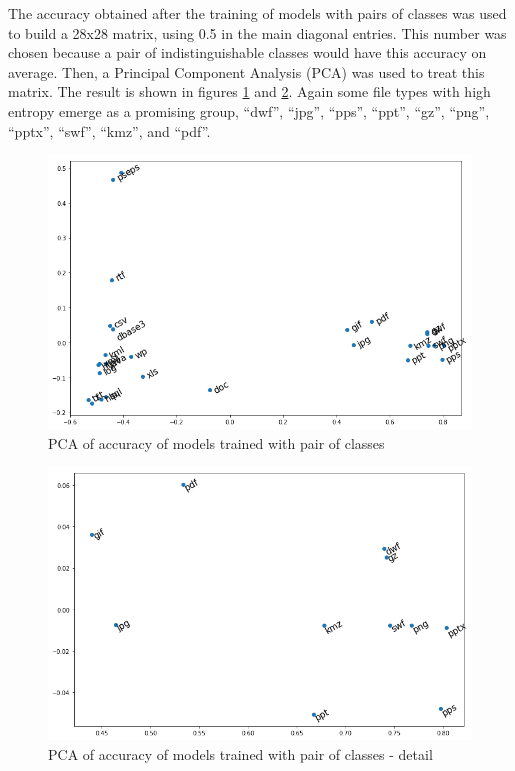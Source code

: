 The accuracy obtained after the training of models with pairs of classes was used to build a 28x28 matrix, using 0.5 in the main diagonal entries. This number was chosen because a pair of indistinguishable classes would have this accuracy on average. Then, a Principal Component Analysis (PCA) \cite{amirani_new_2008} was used to treat this matrix. The result is shown in figures \ref{fig:pca} and \ref{fig:pca2}. Again some file types with high entropy emerge as a promising group,  ``dwf'',
``jpg'',
``pps'',
``ppt'',
``gz'',
``png'',
``pptx'',
``swf'',
``kmz'',
and ``pdf''.

\noindent
\begin{figure}[htb!]
\centering\includegraphics[width=1.0\textwidth]{content/pca.png}
\caption{\label{fig:pca}PCA of accuracy of models trained with pair of classes}%
\end{figure}


\noindent
\begin{figure}[htb!]
\centering\includegraphics[width=1.0\textwidth]{content/pca2.png}
\caption{\label{fig:pca2}PCA of accuracy of models trained with pair of classes - detail}%
\end{figure}


